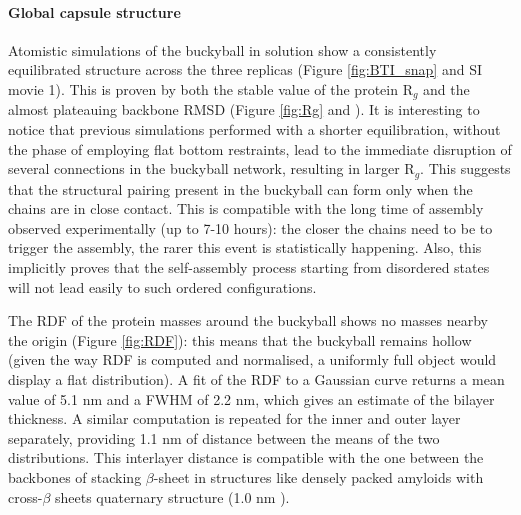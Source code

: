\paragraph{Global capsule structure} Atomistic simulations of the buckyball in solution show a consistently equilibrated structure across the three replicas (Figure \ref{fig:BTI_snap} and SI movie 1).
%
This is proven by both the stable value of the protein R$_g$ and the almost plateauing backbone RMSD (Figure \ref{fig:Rg} and ). It is interesting to notice that previous simulations performed with a shorter equilibration, without the phase of employing flat bottom restraints, lead to the immediate disruption of several connections in the buckyball network, resulting in larger R$_g$. This suggests that the structural pairing present in the buckyball can form only when the chains are in close contact. This is compatible with the long time of assembly observed experimentally (up to 7-10 hours): the closer the chains need to be to trigger the assembly, the rarer this event is statistically happening. Also, this implicitly proves that the self-assembly process starting from disordered states will not lead easily to such ordered configurations.

The RDF of the protein masses around the buckyball shows no masses nearby the origin (Figure \ref{fig:RDF}): this means that the buckyball remains hollow (given the way RDF is computed and normalised, a uniformly full object would display a flat distribution).
%
A fit of the RDF to a Gaussian curve returns a mean value of 5.1 nm and a FWHM of 2.2 nm, which gives an estimate of the bilayer thickness.
%
A similar computation is repeated for the inner and outer layer separately, providing 1.1 nm of distance between the means of the two distributions. This interlayer distance is compatible with the one between the backbones of stacking $\beta$-sheet in structures like densely packed amyloids with cross-$\beta$ sheets quaternary structure (1.0 nm \citep{Sunde1997}).

